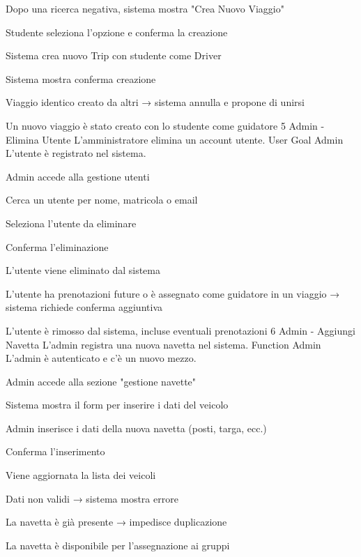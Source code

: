 {\begin{description}[nosep]
    \item[1.] Dopo una ricerca negativa, sistema mostra "Crea Nuovo Viaggio"
    \item[2.] Studente seleziona l'opzione e conferma la creazione
    \item[3.] Sistema crea nuovo Trip con studente come Driver
    \item[4.] Sistema mostra conferma creazione
\end{description}}
{\begin{description}[nosep]
    \item[3a.] Viaggio identico creato da altri → sistema annulla e propone di unirsi
\end{description}}
{Un nuovo viaggio è stato creato con lo studente come guidatore}
\label{uc:uc4}
\UseCase
{5}
{Admin - Elimina Utente}
{L’amministratore elimina un account utente.}
{User Goal}
{Admin}
{L’utente è registrato nel sistema.}
{\begin{description}[nosep]
    \item[1.] Admin accede alla gestione utenti
    \item[2.] Cerca un utente per nome, matricola o email
    \item[3.] Seleziona l’utente da eliminare
    \item[4.] Conferma l’eliminazione
    \item[5.] L'utente viene eliminato dal sistema
\end{description}}
{\begin{description}[nosep]
    \item[3a.] L’utente ha prenotazioni future o è assegnato come guidatore in un viaggio → sistema richiede conferma aggiuntiva
\end{description}}
{L’utente è rimosso dal sistema, incluse eventuali prenotazioni}
\label{uc:uc5}
\UseCase
{6}
{Admin - Aggiungi Navetta}
{L’admin registra una nuova navetta nel sistema.}
{Function}
{Admin}
{L’admin è autenticato e c'è un nuovo mezzo.}
{\begin{description}[nosep]
    \item[1.] Admin accede alla sezione "gestione navette"
    \item[2.] Sistema mostra il form per inserire i dati del veicolo
    \item[3.] Admin inserisce i dati della nuova navetta (posti, targa, ecc.)
    \item[4.] Conferma l’inserimento
    \item[5.] Viene aggiornata la lista dei veicoli
\end{description}}
{\begin{description}[nosep]
    \item[2a.] Dati non validi → sistema mostra errore
    \item[3a.] La navetta è già presente → impedisce duplicazione
\end{description}}
{La navetta è disponibile per l’assegnazione ai gruppi}
\label{uc:uc6}
